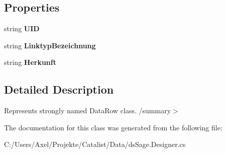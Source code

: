 \subsection*{Properties}
\begin{DoxyCompactItemize}
\item 
string {\bfseries U\+ID}\hypertarget{class_products_1_1_data_1_1ds_sage_1_1_linktyp_row_ad31e52fddecc76267fabc84e86172688}{}\label{class_products_1_1_data_1_1ds_sage_1_1_linktyp_row_ad31e52fddecc76267fabc84e86172688}

\item 
string {\bfseries Linktyp\+Bezeichnung}\hypertarget{class_products_1_1_data_1_1ds_sage_1_1_linktyp_row_a59329d7c1ce2e9bbf3319753a21a6116}{}\label{class_products_1_1_data_1_1ds_sage_1_1_linktyp_row_a59329d7c1ce2e9bbf3319753a21a6116}

\item 
string {\bfseries Herkunft}\hypertarget{class_products_1_1_data_1_1ds_sage_1_1_linktyp_row_a21a10c3464f17cf5ec636bbc98711c6f}{}\label{class_products_1_1_data_1_1ds_sage_1_1_linktyp_row_a21a10c3464f17cf5ec636bbc98711c6f}

\end{DoxyCompactItemize}


\subsection{Detailed Description}
Represents strongly named Data\+Row class. /summary$>$ 

The documentation for this class was generated from the following file\+:\begin{DoxyCompactItemize}
\item 
C\+:/\+Users/\+Axel/\+Projekte/\+Catalist/\+Data/ds\+Sage.\+Designer.\+cs\end{DoxyCompactItemize}
